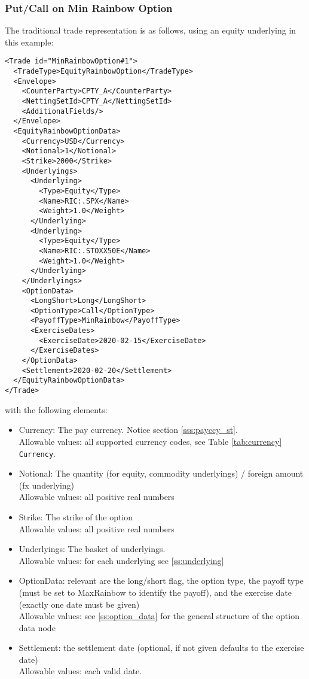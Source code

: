 \subsubsection*{Put/Call on Min Rainbow Option}

The traditional trade representation is as follows, using an equity underlying in this example:

\begin{verbatim}
<Trade id="MinRainbowOption#1">
  <TradeType>EquityRainbowOption</TradeType>
  <Envelope>
    <CounterParty>CPTY_A</CounterParty>
    <NettingSetId>CPTY_A</NettingSetId>
    <AdditionalFields/>
  </Envelope>
  <EquityRainbowOptionData>
    <Currency>USD</Currency>
    <Notional>1</Notional>
    <Strike>2000</Strike>
    <Underlyings>
      <Underlying>
        <Type>Equity</Type>
        <Name>RIC:.SPX</Name>
        <Weight>1.0</Weight>
      </Underlying>
      <Underlying>
        <Type>Equity</Type>
        <Name>RIC:.STOXX50E</Name>
        <Weight>1.0</Weight>
      </Underlying>
    </Underlyings>
    <OptionData>
      <LongShort>Long</LongShort>
      <OptionType>Call</OptionType>
      <PayoffType>MinRainbow</PayoffType>
      <ExerciseDates>
        <ExerciseDate>2020-02-15</ExerciseDate>
      </ExerciseDates>
    </OptionData>
    <Settlement>2020-02-20</Settlement>
  </EquityRainbowOptionData>
</Trade>
\end{verbatim}

with the following elements:

\begin{itemize}
\item Currency: The pay currency. Notice section \ref{sss:payccy_st}. \\
  Allowable values: all supported currency codes, see Table \ref{tab:currency} \lstinline!Currency!.
\item Notional: The quantity (for equity, commodity underlyings) / foreign amount (fx underlying) \\
  Allowable values: all positive real numbers
\item Strike: The strike of the option \\
  Allowable values: all positive real numbers
\item Underlyings: The basket of underlyings. \\
  Allowable values: for each underlying see \ref{ss:underlying}
\item OptionData: relevant are the long/short flag, the option type, the payoff type (must be set to MaxRainbow to
  identify the payoff), and the exercise date (exactly one date must be given) \\
  Allowable values: see \ref{ss:option_data} for the general structure of the option data node
\item Settlement: the settlement date (optional, if not given defaults to the exercise date) \\
  Allowable values: each valid date.
\end{itemize}

